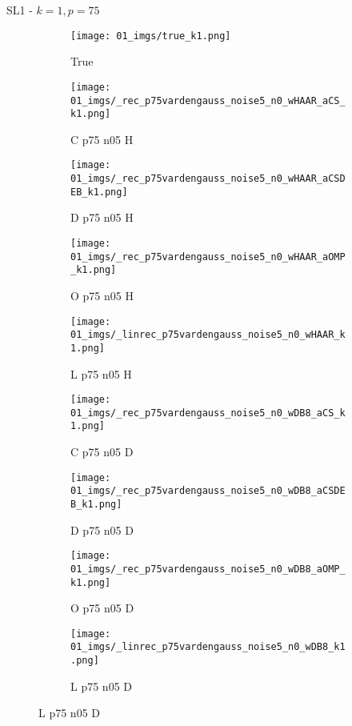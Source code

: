 \begin{frame}{SL1 - $k=1,p=75$}{}
\begin{figure}
\begin{subfigure}{0.1\textwidth}
\texttt{[image: 01\_imgs/true\_k1.png]}
\caption*{\Tiny True}
\end{subfigure}
\begin{subfigure}{0.1\textwidth}
\texttt{[image: 01\_imgs/\_rec\_p75vardengauss\_noise5\_n0\_wHAAR\_aCS\_k1.png]}
\caption*{\Tiny C p75 n05 H}
\end{subfigure}
\begin{subfigure}{0.1\textwidth}
\texttt{[image: 01\_imgs/\_rec\_p75vardengauss\_noise5\_n0\_wHAAR\_aCSDEB\_k1.png]}
\caption*{\Tiny D p75 n05 H}
\end{subfigure}
\begin{subfigure}{0.1\textwidth}
\texttt{[image: 01\_imgs/\_rec\_p75vardengauss\_noise5\_n0\_wHAAR\_aOMP\_k1.png]}
\caption*{\Tiny O p75 n05 H}
\end{subfigure}
\begin{subfigure}{0.1\textwidth}
\texttt{[image: 01\_imgs/\_linrec\_p75vardengauss\_noise5\_n0\_wHAAR\_k1.png]}
\caption*{\Tiny L p75 n05 H}
\end{subfigure}
\begin{subfigure}{0.1\textwidth}
\texttt{[image: 01\_imgs/\_rec\_p75vardengauss\_noise5\_n0\_wDB8\_aCS\_k1.png]}
\caption*{\Tiny C p75 n05 D}
\end{subfigure}
\begin{subfigure}{0.1\textwidth}
\texttt{[image: 01\_imgs/\_rec\_p75vardengauss\_noise5\_n0\_wDB8\_aCSDEB\_k1.png]}
\caption*{\Tiny D p75 n05 D}
\end{subfigure}
\begin{subfigure}{0.1\textwidth}
\texttt{[image: 01\_imgs/\_rec\_p75vardengauss\_noise5\_n0\_wDB8\_aOMP\_k1.png]}
\caption*{\Tiny O p75 n05 D}
\end{subfigure}
\begin{subfigure}{0.1\textwidth}
\texttt{[image: 01\_imgs/\_linrec\_p75vardengauss\_noise5\_n0\_wDB8\_k1.png]}
\caption*{\Tiny L p75 n05 D}
\end{subfigure}

\vspace{5pt}


\end{figure}
\end{frame}
